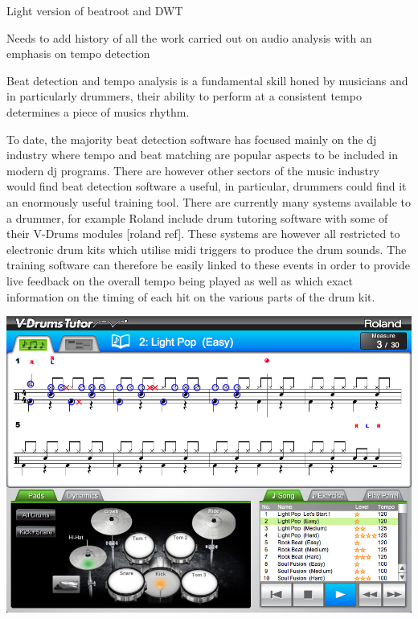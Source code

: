 \documentclass[a4paper, 11pt]{article}
\begin{document}
Light version of beatroot and DWT

Needs to add history of all the work carried out on audio analysis with an emphasis on tempo detection

Beat detection and tempo analysis is a fundamental skill honed by musicians and in particularly drummers, their ability to perform at a consistent tempo determines a piece of musics rhythm. 

To date, the majority beat detection software has focused mainly on the dj industry where tempo and beat matching are popular aspects to be included in modern dj programs. There are however other sectors of the music industry would find beat detection software a useful, in particular, drummers could find it an enormously useful training tool. There are currently many systems available to a drummer, for example Roland include drum tutoring software with some of their V-Drums modules [roland ref]. These systems are however all restricted to electronic drum kits which utilise midi triggers to produce the drum sounds. The training software can therefore be easily linked to these events in order to provide live feedback on the overall tempo being played as well as which exact information on the timing of each hit on the various parts of the drum kit. 

\includegraphics[scale=0.2]{dt-1_ss_main_notation_gal} 




\subsection{}
\end{document}
